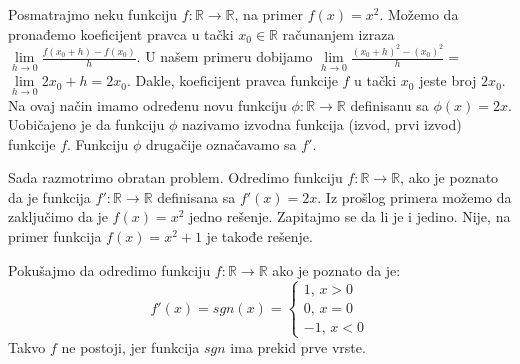 \documentclass{article}
\begin{document}
Posmatrajmo neku funkciju $f: \mathbb{R} \longrightarrow \mathbb{R}$, na primer
$f(x) = x^2$. Možemo da pronađemo koeficijent pravca u tački
$x_0 \in \mathbb{R}$ računanjem izraza $\lim\limits_{h \to 0} \frac{f(x_0+h) - f(x_0)}{h}$.
U našem primeru dobijamo
$\lim\limits_{h \to 0} \frac{(x_0+h)^2 - (x_0)^2}{h} = $
$\lim\limits_{h \to 0} 2 x_0 + h = 2 x_0$.
Dakle, koeficijent pravca funkcije $f$ u tački $x_0$ jeste broj $2 x_0$.
Na ovaj način imamo određenu novu funkciju
$\phi : \mathbb{R} \longrightarrow \mathbb{R}$ definisanu
sa $\phi(x) = 2 x$. Uobičajeno je da funkciju $\phi$ nazivamo
izvodna funkcija (izvod, prvi izvod) funkcije $f$.
Funkciju $\phi$ drugačije označavamo sa $f'$.\par
Sada razmotrimo obratan problem. Odredimo funkciju $f: \mathbb{R} \longrightarrow \mathbb{R}$,
ako je poznato da je funkcija
$f': \mathbb{R} \longrightarrow \mathbb{R}$ definisana sa
$f'(x) = 2 x$. Iz prošlog primera možemo da zaključimo da je $f(x) = x^2$ jedno rešenje. Zapitajmo
se da li je i jedino. Nije, na primer funkcija $f(x) = x^2 + 1$
je takođe rešenje.\par
Pokušajmo da odredimo funkciju $f: \mathbb{R} \longrightarrow \mathbb{R}$ ako je
poznato da je:
$$
    f'(x) = sgn(x)=
    \begin{cases}
        1\text{, }x > 0 \\
        0\text{, }x = 0 \\
        -1\text{, }x < 0
    \end{cases}
$$
Takvo $f$ ne postoji, jer funkcija $sgn$ ima prekid prve vrste.
\end{document}
